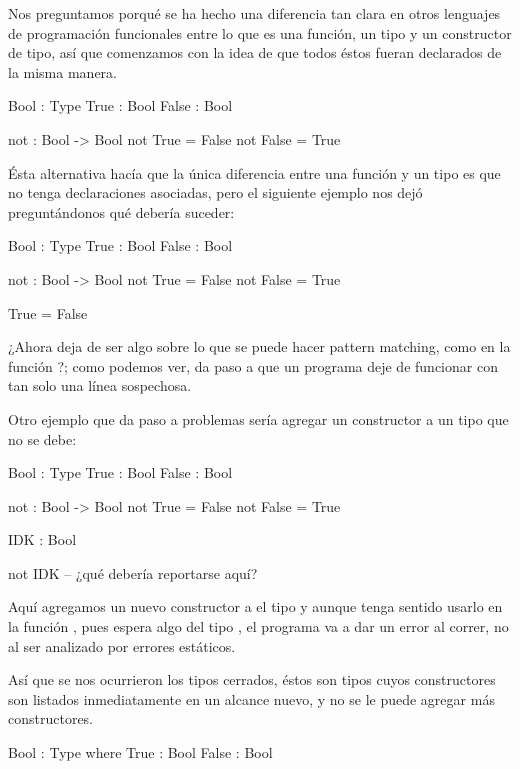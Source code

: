 \begin{blueleft}
Nos preguntamos porqué se ha hecho una diferencia tan clara en otros lenguajes de programación funcionales entre lo que es una función, un tipo y un constructor de tipo, así que comenzamos con la idea de que todos éstos fueran declarados de la misma manera.

\begin{anglercode}
Bool : Type
True : Bool
False : Bool

not : Bool -> Bool
not True = False
not False = True
\end{anglercode}

Ésta alternativa hacía que la única diferencia entre una función y un tipo es que no tenga declaraciones asociadas, pero el siguiente ejemplo nos dejó preguntándonos qué debería suceder:

\begin{anglercode}
Bool : Type
True : Bool
False : Bool

not : Bool -> Bool
not True = False
not False = True

True = False
\end{anglercode}

¿Ahora  deja de ser algo sobre lo que se puede hacer pattern matching, como en la función ?; como podemos ver, da paso a que un programa deje de funcionar con tan solo una línea sospechosa.

Otro ejemplo que da paso a problemas sería agregar un constructor a un tipo que no se debe:

\begin{anglercode}
Bool : Type
True : Bool
False : Bool

not : Bool -> Bool
not True = False
not False = True

IDK : Bool

not IDK     -- ¿qué debería reportarse aquí?
\end{anglercode}

Aquí agregamos un nuevo constructor a el tipo  y aunque tenga sentido usarlo en la función , pues espera algo del tipo , el programa va a dar un error al correr, no al ser analizado por errores estáticos.

Así que se nos ocurrieron los tipos cerrados, éstos son tipos cuyos constructores son listados inmediatamente en un alcance nuevo, y no se le puede agregar más constructores.

\begin{anglercode}
Bool : Type where
    True : Bool
    False : Bool


\end{anglercode}
\end{blueleft}
